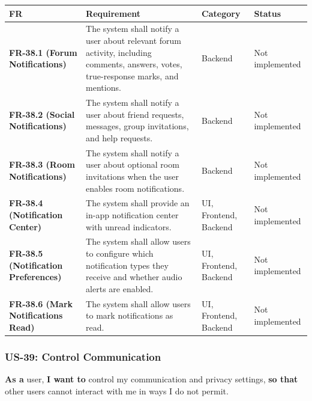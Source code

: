 \documentclass[12pt]{article}
\renewcommand{\baselinestretch}{1.5}
\begin{document}
\begingroup
\small
\renewcommand{\baselinestretch}{1.0}\selectfont
\renewcommand{\arraystretch}{1.15}
\setlength{\tabcolsep}{6pt}
\begin{longtable}{|>{\raggedright\arraybackslash}p{}|>{\raggedright\arraybackslash}p{}|>{\raggedright\arraybackslash}p{}|>{\raggedright\arraybackslash}p{}|}
\hline
\textbf{FR} & \textbf{Requirement} & \textbf{Category} & \textbf{Status} \\ \hline
\endhead
\textbf{FR-38.1 (Forum Notifications)} & The system shall notify a user about relevant forum activity, including comments, answers, votes, true-response marks, and mentions. & Backend & Not implemented \\ \hline
\textbf{FR-38.2 (Social Notifications)} & The system shall notify a user about friend requests, messages, group invitations, and help requests. & Backend & Not implemented \\ \hline
\textbf{FR-38.3 (Room Notifications)} & The system shall notify a user about optional room invitations when the user enables room notifications. & Backend & Not implemented \\ \hline
\textbf{FR-38.4 (Notification Center)} & The system shall provide an in-app notification center with unread indicators. & UI, Frontend, Backend & Not implemented \\ \hline
\textbf{FR-38.5 (Notification Preferences)} & The system shall allow users to configure which notification types they receive and whether audio alerts are enabled. & UI, Frontend, Backend & Not implemented \\ \hline
\textbf{FR-38.6 (Mark Notifications Read)} & The system shall allow users to mark notifications as read. & UI, Frontend, Backend & Not implemented \\ \hline
\end{longtable}
\endgroup
\par\medskip

\hypertarget{sec:us-39-control-communication}{}
\subsubsection*{US-39: Control Communication}
\par\medskip

\textbf{As a} user, \textbf{I want to} control my communication and privacy settings, \textbf{so that} other users cannot interact with me in ways I do not permit.
\par\medskip
\end{document}
